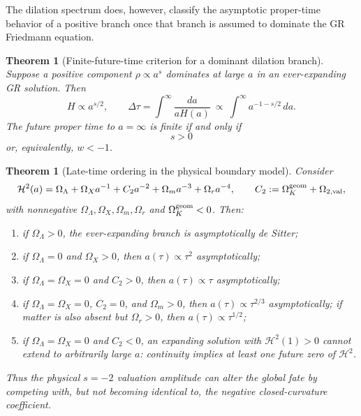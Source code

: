 \documentclass[11pt,a4paper]{article}
\def\dd{d}%
\numberwithin{equation}{section}
\theoremstyle{definition}
\theoremstyle{plain}
\newtheorem{theorem}[criterion]{Theorem}
\theoremstyle{remark}
\newcommand{\dd}{\mathrm{d}}
\begin{document}
The dilation spectrum does, however, classify the asymptotic proper-time behavior of a positive branch once that branch is assumed to dominate the GR Friedmann equation.

\begin{theorem}[Finite-future-time criterion for a dominant dilation branch]
Suppose a positive component \(\rho\propto a^s\) dominates at large \(a\) in an ever-expanding GR solution. Then
\begin{equation}
H\propto a^{s/2},
\qquad
\boxed{
\Delta\tau=\int^{\infty}\frac{\dd a}{aH(a)}
}\ \propto\ \int^\infty a^{-1-s/2}\,\dd a.
\end{equation}
The future proper time to \(a=\infty\) is finite if and only if
\begin{equation}
\boxed{s>0}
\end{equation}
or, equivalently, \(w<-1\).
\end{theorem}

\begin{theorem}[Late-time ordering in the physical boundary model]
Consider
\begin{equation}
\mathcal H^2(a)=\Omega_\Lambda+\Omega_Xa^{-1}+C_2a^{-2}+\Omega_ma^{-3}+\Omega_ra^{-4},
\qquad
C_2:=\Omega_K^{\rm geom}+\Omega_{2,\rm val},
\end{equation}
with nonnegative \(\Omega_\Lambda,\Omega_X,\Omega_m,\Omega_r\) and \(\Omega_K^{\rm geom}<0\). Then:
\begin{enumerate}
\item if \(\Omega_\Lambda>0\), the ever-expanding branch is asymptotically de Sitter;
\item if \(\Omega_\Lambda=0\) and \(\Omega_X>0\), then \(a(\tau)\propto\tau^2\) asymptotically;
\item if \(\Omega_\Lambda=\Omega_X=0\) and \(C_2>0\), then \(a(\tau)\propto\tau\) asymptotically;
\item if \(\Omega_\Lambda=\Omega_X=0\), \(C_2=0\), and \(\Omega_m>0\), then \(a(\tau)\propto\tau^{2/3}\) asymptotically; if matter is also absent but \(\Omega_r>0\), then \(a(\tau)\propto\tau^{1/2}\);
\item if \(\Omega_\Lambda=\Omega_X=0\) and \(C_2<0\), an expanding solution with \(\mathcal H^2(1)>0\) cannot extend to arbitrarily large \(a\): continuity implies at least one future zero of \(\mathcal H^2\).
\end{enumerate}
Thus the physical \(s=-2\) valuation amplitude can alter the global fate by competing with, but not becoming identical to, the negative closed-curvature coefficient.
\end{theorem}
\end{document}
